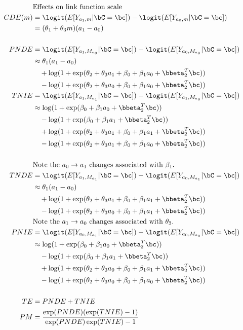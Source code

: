 \documentclass[dvipdfmx,10pt]{article}
\begin{document}
\begin{align*}
  &\text{Effects on link function scale}\\
  CDE(m) &= \logit(E[Y_{a_{1},m} | \bC = \bc]) - \logit(E[Y_{a_{0},m} | \bC = \bc])\\
  &= (\theta_{1} + \theta_{3}m)(a_{1} - a_{0})\\
  \\
  PNDE &= \logit(E[Y_{a_{1},M_{a_{0}}} | \bC = \bc]) - \logit(E[Y_{a_{0},M_{a_{0}}} | \bC = \bc])\\
  &\approx \theta_{1}(a_{1} - a_{0})\\
  &~~~ + \log(1 + \exp(\theta_{2} + \theta_{3}a_{1} + \beta_{0} + \beta_{1} a_{0} + \bbeta_{2}^T\bc))\\
  &~~~ - \log(1 + \exp(\theta_{2} + \theta_{3}a_{0} + \beta_{0} + \beta_{1} a_{0} + \bbeta_{2}^T\bc))\\
  TNIE &= \logit(E[Y_{a_{1},M_{a_{1}}} | \bC = \bc]) - \logit(E[Y_{a_{1},M_{a_{0}}} | \bC = \bc])\\
  &\approx \log(1 + \exp(\beta_{0} + \beta_{1} a_{0} + \bbeta_{2}^T\bc))\\
  &~~~ - \log(1 + \exp(\beta_{0} + \beta_{1} a_{1} + \bbeta_{2}^T\bc))\\
  &~~~ + \log(1 + \exp(\theta_{2} + \theta_{3}a_{1} + \beta_{0} + \beta_{1} a_{1} + \bbeta_{2}^T\bc))\\
  &~~~ - \log(1 + \exp(\theta_{2} + \theta_{3}a_{1} + \beta_{0} + \beta_{1} a_{0} + \bbeta_{2}^T\bc))\\
  \\
  &\text{Note the $a_{0} \rightarrow a_{1}$ changes associated with $\beta_{1}$.}\\
  TNDE &= \logit(E[Y_{a_{1},M_{a_{1}}} | \bC = \bc]) - \logit(E[Y_{a_{0},M_{a_{1}}} | \bC = \bc])\\
  &\approx \theta_{1}(a_{1} - a_{0})\\
  &~~~ + \log(1 + \exp(\theta_{2} + \theta_{3}a_{1} + \beta_{0} + \beta_{1} a_{1} + \bbeta_{2}^T\bc))\\
  &~~~ - \log(1 + \exp(\theta_{2} + \theta_{3}a_{0} + \beta_{0} + \beta_{1} a_{1} + \bbeta_{2}^T\bc))\\
  &\text{Note the $a_{1} \rightarrow a_{0}$ changes associated with $\theta_{3}$.}\\
  PNIE &= \logit(E[Y_{a_{0},M_{a_{1}}} | \bC = \bc]) - \logit(E[Y_{a_{0},M_{a_{0}}} | \bC = \bc])\\
  &\approx \log(1 + \exp(\beta_{0} + \beta_{1} a_{0} + \bbeta_{2}^T\bc))\\
  &~~~ - \log(1 + \exp(\beta_{0} + \beta_{1} a_{1} + \bbeta_{2}^T\bc))\\
  &~~~ + \log(1 + \exp(\theta_{2} + \theta_{3}a_{0} + \beta_{0} + \beta_{1} a_{1} + \bbeta_{2}^T\bc))\\
  &~~~ - \log(1 + \exp(\theta_{2} + \theta_{3}a_{0} + \beta_{0} + \beta_{1} a_{0} + \bbeta_{2}^T\bc))\\
  \\
  TE &= PNDE + TNIE\\
  PM &= \frac{\exp(PNDE)(\exp(TNIE) - 1)}{\exp(PNDE)\exp(TNIE) - 1}\\
\end{align*}
\end{document}
